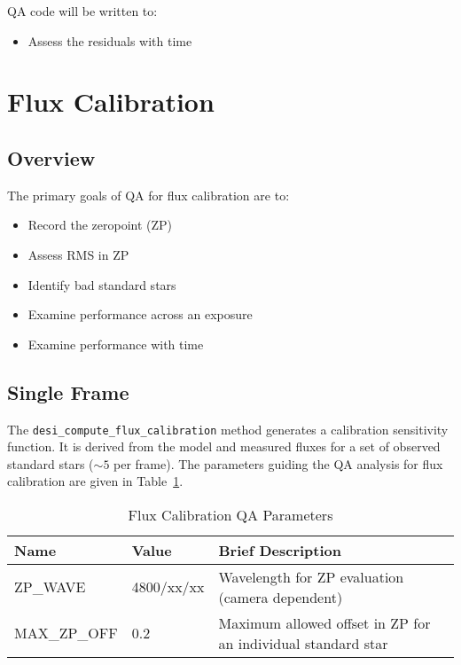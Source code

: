 \documentclass[12pt]{article}
\newenvironment{myitemize}
{ \begin{itemize}
    \setlength{\itemsep}{0pt}
    \setlength{\parskip}{0pt}
    \setlength{\parsep}{0pt}     }
{ \end{itemize}                  }
\begin{document}
QA code will be written to:

\begin{myitemize}
\item Assess the residuals with time
\end{myitemize}

\section{Flux Calibration}

\subsection{Overview}

The primary goals of QA for flux calibration are to:

\begin{myitemize}
\item Record the zeropoint (ZP) 
\item Assess RMS in ZP
\item Identify bad standard stars
\item Examine performance across an exposure
\item Examine performance with time
\end{myitemize}

\subsection{Single Frame}

The {\tt desi\_compute\_flux\_calibration} method generates
a calibration sensitivity function.  It is derived
from the model and measured fluxes for
a set of observed standard stars ($\sim 5$ per frame).
The parameters guiding the QA analysis for flux
calibration are given in Table~\ref{tab:flux_param}.

\begin{table}[h]
\begin{center}
\caption{Flux Calibration QA Parameters}
\label{tab:flux_param}
\begin{tabular}{p{3.5cm}p{1.8cm}p{8.2cm}}
\hline
{\bf Name} & {\bf Value} & {\bf Brief Description}\\
\hline
ZP\_WAVE       & 4800/xx/xx & Wavelength for ZP evaluation (camera dependent) \\
MAX\_ZP\_OFF   & 0.2        & Maximum allowed offset in ZP for an individual standard star \\
\hline
\end{tabular}
\end{center}
\end{table}
\end{document}
